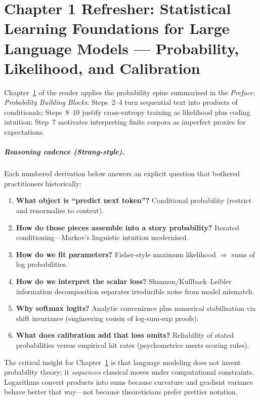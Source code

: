 \chapter{Chapter 1 Refresher: Statistical Learning Foundations for Large Language Models --- Probability, Likelihood, and Calibration}
\label{chap:stat-foundations}

\scenelabel
Chapter~\ref{chap:stat-foundations} of the reader applies the probability spine summarised in the \emph{Preface: Probability Building Blocks}: Steps~2--4 turn sequential text into products of conditionals; Steps~8--10 justify cross-entropy training as likelihood plus coding intuition; Step~7 motivates interpreting finite corpora as imperfect proxies for expectations.

\paragraph{Reasoning cadence (Strang-style).}
Each numbered derivation below answers an explicit question that bothered practitioners historically:
\begin{enumerate}[leftmargin=1.5em]
  \item \textbf{What object is ``predict next token''?} Conditional probability (restrict and renormalise to context).
  \item \textbf{How do those pieces assemble into a story probability?} Iterated conditioning---Markov's linguistic intuition modernised.
  \item \textbf{How do we fit parameters?} Fisher-style maximum likelihood $\Rightarrow$ sums of log probabilities.
  \item \textbf{How do we interpret the scalar loss?} Shannon/Kullback--Leibler information decomposition separates irreducible noise from model mismatch.
  \item \textbf{Why softmax logits?} Analytic convenience plus numerical stabilisation via shift invariance (engineering cousin of log-sum-exp proofs).
  \item \textbf{What does calibration add that loss omits?} Reliability of stated probabilities versus empirical hit rates (psychometrics meets scoring rules).
\end{enumerate}

The critical insight for Chapter~\ref{chap:stat-foundations} is that language modeling does not invent probability theory; it \emph{sequences} classical moves under computational constraints. Logarithms convert products into sums because curvature and gradient variance behave better that way---not because theoreticians prefer prettier notation.

